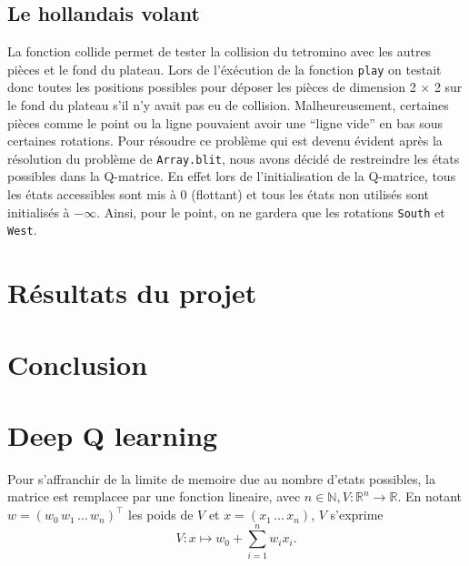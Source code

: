 \documentclass{article}
\newcommand{\R}{\mathbb{R}}
\begin{document}
\subsection{Le hollandais volant}
La fonction collide permet de tester la collision du tetromino avec les autres
pièces et le fond du plateau. Lors de l'éxécution de la fonction \texttt{play}
on testait donc toutes les positions possibles pour déposer les pièces de
dimension 2 \(\times \) 2 sur le fond du plateau s'il n'y avait pas eu de
collision. Malheureusement, certaines pièces comme le point ou la ligne
pouvaient avoir une ``ligne vide'' en bas sous certaines rotations. Pour
résoudre ce problème qui est devenu évident après la résolution du problème de
\texttt{Array.blit}, nous avons décidé de restreindre les états possibles dans
la Q-matrice. En effet lors de l'initialisation de la Q-matrice, tous les états
accessibles sont mis à 0 (flottant) et tous les états non utilisés sont
initialisés à \(-\infty \). Ainsi, pour le point, on ne gardera que les
rotations \texttt{South} et \texttt{West}.

\section{R\'esultats du projet}

\section*{Conclusion}

\appendix
\section{Deep Q learning}

Pour s'affranchir de la limite de memoire due au nombre d'etats possibles, la
matrice est remplacee par une fonction lineaire, avec \(n \in \mathbb{N}, V
\colon \R^n \to \R\). En notant \(w = (w_0\, w_1\, \dots\, w_n)^\top\) les poids
de \(V\) et \(x = (x_1\, \dots\, x_n)\), \(V\) s'exprime
\[
  V \colon x \mapsto w_0 + \sum_{i=1}^n w_i x_i.
\]
\end{document}
